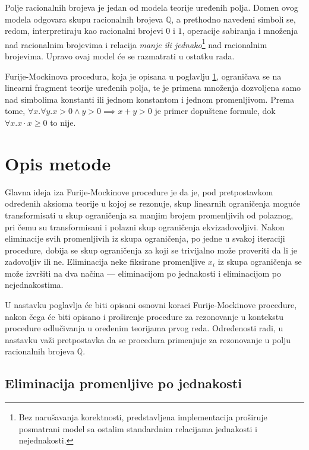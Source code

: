 \documentclass[a4paper,10pt]{article}
\begin{document}
Polje racionalnih brojeva je jedan od modela teorije uređenih polja. Domen ovog modela odgovara skupu racionalnih brojeva $\mathbb{Q}$, a prethodno navedeni simboli se, redom, interpretiraju kao racionalni brojevi $0$ i $1$, operacije sabiranja i množenja nad racionalnim brojevima i relacija \textit{manje ili jednako}\footnote{Bez narušavanja korektnosti, predstavljena implementacija proširuje posmatrani model sa ostalim standardnim relacijama jednakosti i nejednakosti.} nad racionalnim brojevima. Upravo ovaj model će se razmatrati u ostatku rada. 

Furije-Mockinova procedura, koja je opisana u poglavlju \ref{sec:opis_metode}, ograničava se na linearni fragment teorije uređenih polja, te je primena množenja dozvoljena samo nad simbolima konstanti ili jednom konstantom i jednom promenljivom. Prema tome, $\forall x.\forall y.x > 0 \land y > 0 \implies x + y > 0$ je primer dopuštene formule, dok $\forall x.x \cdot x \geq 0$ to nije.

\section{Opis metode}
\label{sec:opis_metode}

Glavna ideja iza Furije-Mockinove procedure je da je, pod pretpostavkom određenih aksioma teorije u kojoj se rezonuje, skup linearnih ograničenja moguće transformisati u skup ograničenja sa manjim brojem promenljivih od polaznog, pri čemu su transformisani i polazni skup ograničenja ekvizadovoljivi. Nakon eliminacije svih promenljivih iz skupa ograničenja, po jedne u svakoj iteraciji procedure, dobija se skup ograničenja za koji se trivijalno može proveriti da li je zadovoljiv ili ne. Eliminacija neke fiksirane promenljive $x_i$ iz skupa ograničenja se može izvršiti na dva načina --- eliminacijom po jednakosti i eliminacijom po nejednakostima.

U nastavku poglavlja će biti opisani osnovni koraci Furije-Mockinove procedure, nakon čega će biti opisano i proširenje procedure za rezonovanje u kontekstu procedure odlučivanja u oređenim teorijama prvog reda. Određenosti radi, u nastavku važi pretpostavka da se procedura primenjuje za rezonovanje u polju racionalnih brojeva $\mathbb{Q}$.

\subsection{Eliminacija promenljive po jednakosti}
\end{document}
